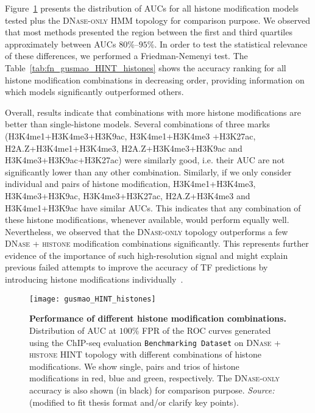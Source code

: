 Figure~\ref{fig:gusmao_HINT_histones} presents the distribution of AUCs for all histone modification models tested plus the \textsc{DNase-only} HMM topology for comparison purpose. We observed that most methods presented the region between the first and third quartiles approximately between AUCs $80\%$--$95\%$. In order to test the statistical relevance of these differences, we performed a Friedman-Nemenyi test. The Table~\ref{tab:fn_gusmao_HINT_histones} shows the accuracy ranking for all histone modification combinations in decreasing order, providing information on which models significantly outperformed others.

Overall, results indicate that combinations with more histone modifications are better than single-histone models. Several combinations of three marks (H3K4me1+H3K4me3+H3K9ac, \linebreak H3K4me1+H3K4me3 +H3K27ac, H2A.Z+H3K4me1+H3K4me3, H2A.Z+H3K4me3+H3K9ac and H3K4me3+H3K9ac+H3K27ac) were similarly good, i.e. their AUC are not significantly lower than any other combination. Similarly, if we only consider individual and pairs of histone modification, H3K4me1+H3K4me3, H3K4me3+H3K9ac, H3K4me3+H3K27ac, H2A.Z+H3K4me3 and \linebreak H3K4me1+H3K9ac have similar AUCs. This indicates that any combination of these histone modifications, whenever available, would perform equally well. Nevertheless, we observed that the \textsc{DNase-only} topology outperforms a few \textsc{DNase + histone} modification combinations significantly. This represents further evidence of the importance of such high-resolution signal and might explain previous failed attempts to improve the accuracy of TF predictions by introducing histone modifications individually~\citep{pique2011,cuellar2012}.

\begin{figure}[h!]
\centering
\texttt{[image: gusmao\_HINT\_histones]}
\caption[Performance of different histone modification combinations]{\textbf{Performance of different histone modification combinations.} Distribution of AUC at $100\%$ FPR of the ROC curves generated using the ChIP-seq evaluation {\tt Benchmarking Dataset} on \textsc{DNase + histone} HINT topology with different combinations of histone modifications. We show single, pairs and trios of histone modifications in red, blue and green, respectively. The \textsc{DNase-only} accuracy is also shown (in black) for comparison purpose. \emph{Source:~\cite{gusmao2014}} (modified to fit thesis format and/or clarify key points).}
\label{fig:gusmao_HINT_histones}
\end{figure}


